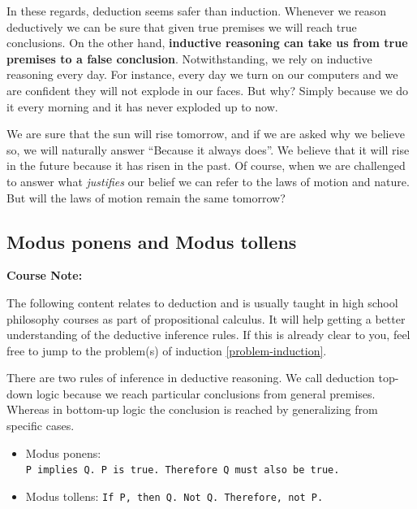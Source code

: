 \documentclass[
]{book}
\providecommand{\tightlist}{%
  \setlength{\itemsep}{0pt}\setlength{\parskip}{0pt}}
\begin{document}
In these regards, deduction seems safer than induction. Whenever we reason deductively we can be sure that given true premises we will reach true conclusions. On the other hand, \textbf{inductive reasoning can take us from true premises to a false conclusion}. Notwithstanding, we rely on inductive reasoning every day. For instance, every day we turn on our computers and we are confident they will not explode in our faces. \citep{okasha-pos} But why? Simply because we do it every morning and it has never exploded up to now.

We are sure that the sun will rise tomorrow, and if we are asked why we believe so, we will naturally answer ``Because it always does''. We believe that it will rise in the future because it has risen in the past. Of course, when we are challenged to answer what \emph{justifies} our belief we can refer to the laws of motion and nature. But will the laws of motion remain the same tomorrow? \citep{russell2001problems}

\hypertarget{modus}{%
\subsection{Modus ponens and Modus tollens}\label{modus}}

\begin{notebox}

\begin{center}
\textbf{Course Note:}

\end{center}

The following content relates to deduction and is usually taught in high school philosophy courses as part of propositional calculus. It will help getting a better understanding of the deductive inference rules. If this is already clear to you, feel free to jump to the problem(s) of induction \ref{problem-induction}.

\end{notebox}

There are two rules of inference in deductive reasoning. We call deduction top-down logic because we reach particular conclusions from general premises. Whereas in bottom-up logic the conclusion is reached by generalizing from specific cases.

\begin{itemize}
\tightlist
\item
  Modus ponens: \texttt{P\ implies\ Q.\ P\ is\ true.\ Therefore\ Q\ must\ also\ be\ true.}
\item
  Modus tollens: \texttt{If\ P,\ then\ Q.\ Not\ Q.\ Therefore,\ not\ P.}
\end{itemize}
\end{document}
